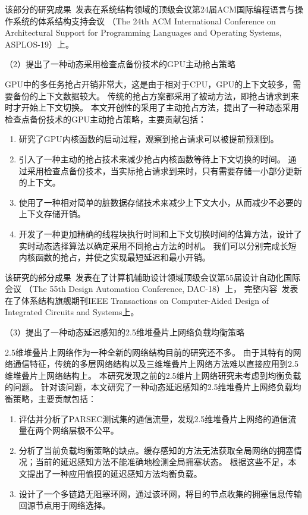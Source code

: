 该部分的研究成果~发表在系统结构领域的顶级会议第24届ACM国际编程语言与操作系统的体系结构支持会议
（The 24th ACM International Conference on Architectural Support for Programming Languages and Operating Systems, ASPLOS-19）上。

（2）提出了一种动态采用检查点备份技术的GPU主动抢占策略

GPU中的多任务抢占开销非常大，这是由于相对于CPU，GPU的上下文较多，需要备份的上下文数据较大。
传统的抢占方案都采用了被动方法，即抢占请求到来时才开始上下文切换。
本文开创性的采用了主动抢占方法，提出了一种动态采用检查点备份技术的GPU主动抢占策略，主要贡献包括：
\renewcommand*\theenumi{(\alph{enumi})}
\begin{enumerate}
\setlength\itemsep{1pt}
\item 研究了GPU内核函数的启动过程，观察到抢占请求可以被提前预测到。
\item 引入了一种主动的抢占技术来减少抢占内核函数等待上下文切换的时间。
通过采用检查点备份技术，当实际抢占请求到来时，只有需要存储一小部分更新的上下文。
\item 使用了一种相对简单的脏数据存储技术来减少上下文大小，从而减少不必要的上下文存储开销。
\item 开发了一种更加精确的线程块执行时间和上下文切换时间的估算方法，设计了实时动态选择算法以确定采用不同抢占方法的时机。
我们可以分别完成长短内核函数的抢占，并使之实现最短延迟和最小开销。
\end{enumerate}

该研究的部分成果~发表在了计算机辅助设计领域顶级会议第55届设计自动化国际会议
（The 55th Design Automation Conference, DAC-18）上，
完整内容~发表在了体系结构旗舰期刊IEEE Transactions on Computer-Aided Design of Integrated Circuits and Systems上。 

（3）提出了一种动态延迟感知的2.5维堆叠片上网络负载均衡策略

2.5维堆叠片上网络作为一种全新的网络结构目前的研究还不多。
由于其特有的网络通信特征，传统的多层网络结构以及三维堆叠片上网络方法难以直接应用到2.5维堆叠片上网络结构上。
本研究发现之前的2.5维片上网络研究未考虑到均衡负载的问题。
针对该问题，本文研究了一种动态延迟感知的2.5维堆叠片上网络负载均衡策略，主要贡献包括：
\renewcommand*\theenumi{(\alph{enumi})}
\begin{enumerate}
\setlength\itemsep{1pt}
\item 评估并分析了PARSEC测试集的通信流量，发现2.5维堆叠片上网络的通信流量在两个网络层极不公平。
\item 分析了当前负载均衡策略的缺点。缓存感知的方法无法获取全局网络的拥塞情况；当前的延迟感知方法不能准确地检测全局拥塞状态。
根据这些不足，本文提出了一种应用偷摸的延迟感知方法均衡负载。
\item 设计了一个多链路无阻塞环网，通过该环网，将目的节点收集的拥塞信息传输回源节点用于网络选择。
\end{enumerate}

